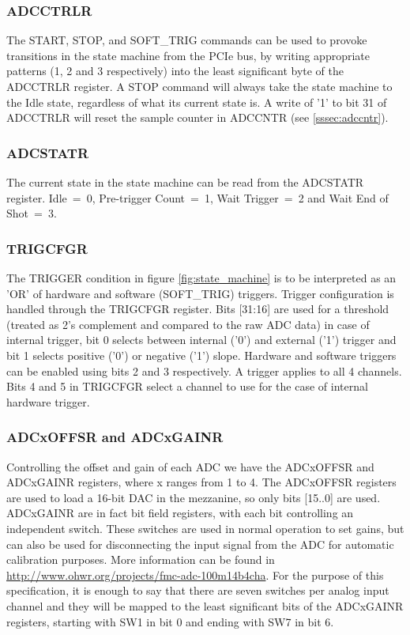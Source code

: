 \documentclass{article}
\begin{document}
\subsubsection{ADCCTRLR}
The START, STOP, and SOFT\_TRIG commands can be used to provoke transitions in the state machine from the PCIe bus, by writing appropriate patterns (1, 2 and 3 respectively) into the least significant byte of the ADCCTRLR register. A STOP command will always take the state machine to the Idle state, regardless of what its current state is. A write of '1' to bit 31 of ADCCTRLR will reset the sample counter in ADCCNTR (see \ref{sssec:adccntr}).

\subsubsection{ADCSTATR}
The current state in the state machine can be read from the ADCSTATR register. Idle~=~0, Pre-trigger Count~=~1, Wait Trigger~=~2 and Wait End of Shot~=~3.

\subsubsection{TRIGCFGR}
The TRIGGER condition in figure \ref{fig:state_machine} is to be interpreted as an 'OR' of hardware and software (SOFT\_TRIG) triggers. Trigger configuration is handled through the TRIGCFGR register. Bits [31:16] are used for a threshold (treated as 2's complement and compared to the raw ADC data) in case of internal trigger, bit 0 selects between internal ('0') and external ('1') trigger and bit 1 selects positive ('0') or negative ('1') slope. Hardware and software triggers can be enabled using bits 2 and 3 respectively. A trigger applies to all 4 channels. Bits 4 and 5 in TRIGCFGR select a channel to use for the case of internal hardware trigger.  

\subsubsection{ADCxOFFSR and ADCxGAINR}
Controlling the offset and gain of each ADC we have the ADCxOFFSR and ADCxGAINR registers, where x ranges from 1 to 4. The ADCxOFFSR registers are used to load a 16-bit DAC in the mezzanine, so only bits [15..0] are used. ADCxGAINR are in fact bit field registers, with each bit controlling an independent switch. These switches are used in normal operation to set gains, but can also be used for disconnecting the input signal from the ADC for automatic calibration purposes. More information can be found in \href{http://www.ohwr.org/projects/fmc-adc-100m14b4cha}{http://www.ohwr.org/projects/fmc-adc-100m14b4cha}. For the purpose of this specification, it is enough to say that there are seven switches per analog input channel and they will be mapped to the least significant bits of the ADCxGAINR registers, starting with SW1 in bit 0 and ending with SW7 in bit 6.
\end{document}
